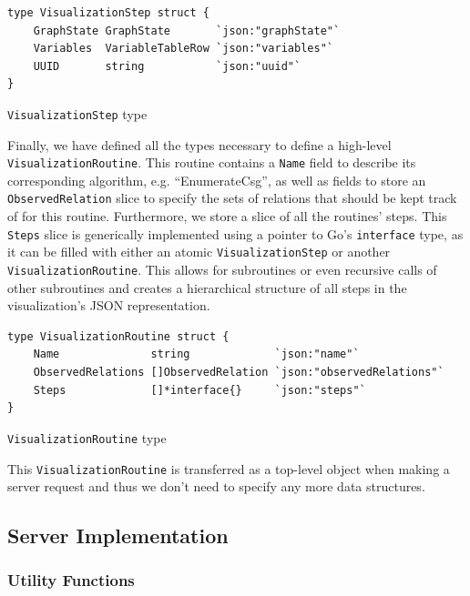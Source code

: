 \begin{code}
\begin{verbatim}
type VisualizationStep struct {
    GraphState GraphState       `json:"graphState"`
    Variables  VariableTableRow `json:"variables"`
    UUID       string           `json:"uuid"`
}
\end{verbatim}
\caption{\texttt{VisualizationStep} type}
\end{code}
\vspace{0.8cm}

Finally, we have defined all the types necessary to define a high-level \texttt{VisualizationRoutine}. This routine contains a \texttt{Name} field to describe its corresponding algorithm, e.g. ``EnumerateCsg'', as well as fields to store an \texttt{ObservedRelation} slice to specify the sets of relations that should be kept track of for this routine. Furthermore, we store a slice of all the routines' steps. This \texttt{Steps} slice is generically implemented using a pointer to Go's \texttt{interface{}} type, as it can be filled with either an atomic \texttt{VisualizationStep} or another \texttt{VisualizationRoutine}. This allows for subroutines or even recursive calls of other subroutines and creates a hierarchical structure of all steps in the visualization's JSON representation. 

\begin{code}
\begin{verbatim}
type VisualizationRoutine struct {
    Name              string             `json:"name"`
    ObservedRelations []ObservedRelation `json:"observedRelations"`
    Steps             []*interface{}     `json:"steps"`
}
\end{verbatim}
\caption{\texttt{VisualizationRoutine} type}
\end{code}
\label{datastructure:visualization-routine}
\vspace{0.8cm}

This \texttt{VisualizationRoutine} is transferred as a top-level object when making a server request and thus we don't need to specify any more data structures.

\subsection{Server Implementation}

\subsubsection{Utility Functions}

